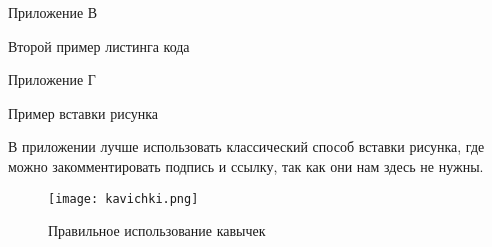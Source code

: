 \documentclass{report}
\begin{document}
\begin{flushright}
     Приложение В
\end{flushright}

\begin{center}  Второй пример листинга кода \end{center}




\newpage


\begin{flushright}
     Приложение Г
\end{flushright}

\begin{center}  Пример вставки рисунка \end{center}

В приложении лучше использовать классический способ вставки рисунка, где можно закомментировать подпись и ссылку, так как они нам здесь не нужны.

\begin{figure}[H]
\centering
    \texttt{[image: kavichki.png]}
    \captionsetup{justification=centering, format=plain}
    \caption{Правильное использование кавычек} %
    \label{fig:pic21}
\end{figure}
\end{document}
